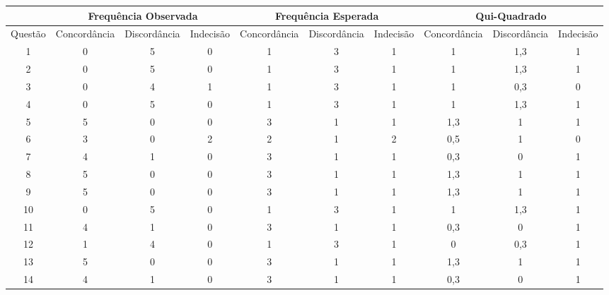 				\begin{landscape}
				\begin{table}[h]
					\centering 
					\begin{tabular}{|c|c|c|c|c|c|c|c|c|c|}

						\hline
						& \multicolumn{3}{|c|}{\textbf{Frequência Observada}} & \multicolumn{3}{c|}{\textbf{Frequência Esperada}} & \multicolumn{3}{c|}{\textbf{Qui-Quadrado}} \\

						\hline

						Questão & Concordância & Discordância & Indecisão & Concordância & Discordância & Indecisão & Concordância & Discordância & Indecisão \\
						
						\hline
						
						1 & 0 & 5 & 0 & 1 & 3 & 1 & 1 & 1,3 & 1 \\
						
						2 & 0 & 5 & 0 & 1 & 3 & 1 & 1 & 1,3 & 1 \\
						
						3 & 0 & 4 & 1 & 1 & 3 & 1 & 1 & 0,3 & 0 \\

						4 & 0 & 5 & 0 & 1 & 3 & 1 & 1 & 1,3 & 1 \\

						5 & 5 & 0 & 0 & 3 & 1 & 1 & 1,3 & 1 & 1 \\

						6 & 3 & 0 & 2 & 2 & 1 & 2 & 0,5 & 1 & 0 \\

						7 & 4 & 1 & 0 & 3 & 1 & 1 & 0,3 & 0 & 1 \\

						8 & 5 & 0 & 0 & 3 & 1 & 1 & 1,3 & 1 & 1 \\

						9 & 5 & 0 & 0 & 3 & 1 & 1 & 1,3 & 1 & 1 \\

						10 & 0 & 5 & 0 & 1 & 3 & 1 & 1 & 1,3 & 1 \\

						11 & 4 & 1 & 0 & 3 & 1 & 1 & 0,3 & 0 & 1 \\

						12 & 1 & 4 & 0 & 1 & 3 & 1 & 0 & 0,3 & 1 \\

						13 & 5 & 0 & 0 & 3 & 1 & 1 & 1,3 & 1 & 1 \\

						14 & 4 & 1 & 0 & 3 & 1 & 1 & 0,3 & 0 & 1 \\


\end{tabular}
\end{table}
\end{landscape}

